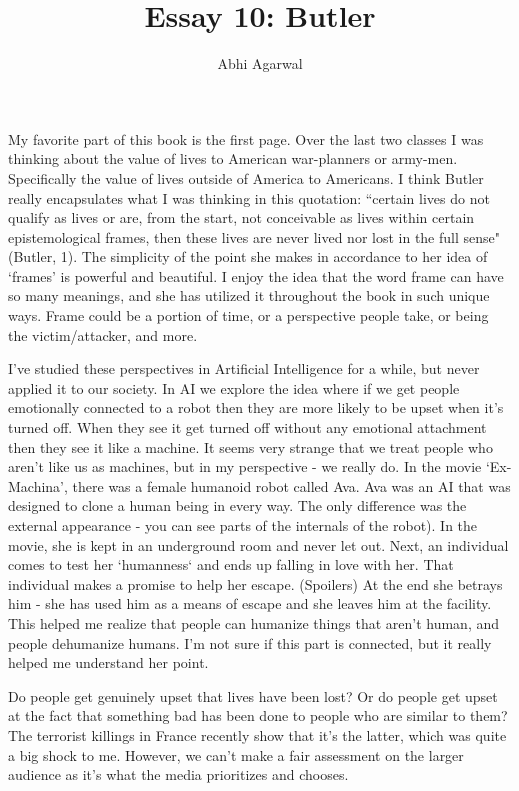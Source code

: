 \documentclass[11pt, oneside]{article}
\title{Essay 10: Butler}
\author{Abhi Agarwal}
\date{}
\begin{document}
\maketitle

\par My favorite part of this book is the first page. Over the last two classes I was thinking about the value of lives to American war-planners or army-men. Specifically the value of lives outside of America to Americans. I think Butler really encapsulates what I was thinking in this quotation: ``certain lives do not qualify as lives or are, from the start, not conceivable as lives within certain epistemological frames, then these lives are never lived nor lost in the full sense" (Butler, 1). The simplicity of the point she makes in accordance to her idea 	of `frames' is powerful and beautiful. I enjoy the idea that the word frame can have so many meanings, and she has utilized it throughout the book in such unique ways. Frame could be a portion of time, or a perspective people take, or being the victim/attacker, and more. 

\par I've studied these perspectives in Artificial Intelligence for a while, but never applied it to our society. In AI we explore the idea where if we get people emotionally connected to a robot then they are more likely to be upset when it's turned off. When they see it get turned off without any emotional attachment then they see it like a machine. It seems very strange that we treat people who aren't like us as machines, but in my perspective - we really do. In the movie `Ex-Machina', there was a female humanoid robot called Ava. Ava was an AI that was designed to clone a human being in every way. The only difference was the external appearance - you can see parts of the internals of the robot). In the movie, she is kept in an underground room and never let out. Next, an individual comes to test her `humanness` and ends up falling in love with her. That individual makes a promise to help her escape. (Spoilers) At the end she betrays him - she has used him as a means of escape and she leaves him at the facility. This helped me realize that people can humanize things that aren't human, and people dehumanize humans. I'm not sure if this part is connected, but it really helped me understand her point. 

\par Do people get genuinely upset that lives have been lost? Or do people get upset at the fact that something bad has been done to people who are similar to them? The terrorist killings in France recently show that it's the latter, which was quite a big shock to me. However, we can't make a fair assessment on the larger audience as it's what the media prioritizes and chooses. 
\end{document}
